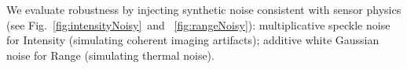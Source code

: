 \documentclass[conference]{IEEEtran}
\begin{document}




We evaluate robustness by injecting synthetic noise consistent with sensor physics (see Fig.~\ref{fig:intensityNoisy}~and~ \ref{fig:rangeNoisy}): multiplicative speckle noise for Intensity (simulating coherent imaging artifacts); additive white Gaussian noise for Range (simulating thermal noise).
\end{document}
